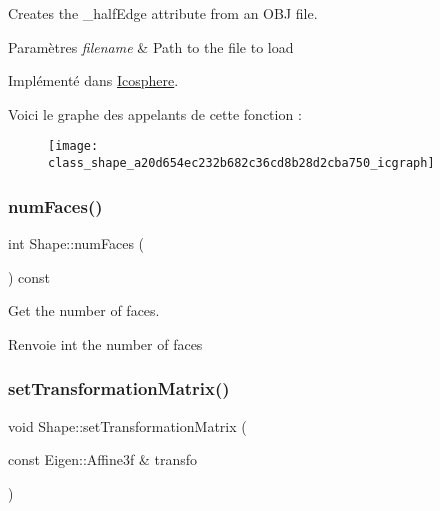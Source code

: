 Creates the \+\_\+half\+Edge attribute from an O\+BJ file. 


\begin{DoxyParams}{Paramètres}
{\em filename} & Path to the file to load \\
\hline
\end{DoxyParams}


Implémenté dans \hyperlink{class_icosphere_a72c3cc3d95cf508a623fe336cbbab350}{Icosphere}.

Voici le graphe des appelants de cette fonction \+:\nopagebreak
\begin{figure}[H]
\begin{center}
\leavevmode
\texttt{[image: class\_shape\_a20d654ec232b682c36cd8b28d2cba750\_icgraph]}
\end{center}
\end{figure}
\mbox{\label{class_shape_aaa316f693b1679276dc2bc1014485ab3}} 
\subsubsection{\texorpdfstring{num\+Faces()}{numFaces()}}
{\footnotesize\ttfamily int Shape\+::num\+Faces (\begin{DoxyParamCaption}{ }\end{DoxyParamCaption}) const\hspace{0.3cm}{\ttfamily [inline]}}



Get the number of faces. 

\begin{DoxyReturn}{Renvoie}
int the number of faces 
\end{DoxyReturn}
\mbox{\label{class_shape_a04294d1d80623bb8c5a7d4037549fa27}} 
\subsubsection{\texorpdfstring{set\+Transformation\+Matrix()}{setTransformationMatrix()}}
{\footnotesize\ttfamily void Shape\+::set\+Transformation\+Matrix (\begin{DoxyParamCaption}\item[{const Eigen\+::\+Affine3f \&}]{transfo }\end{DoxyParamCaption})\hspace{0.3cm}{\ttfamily [inline]}}



